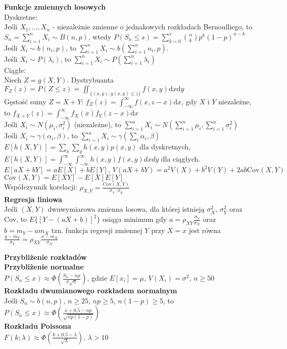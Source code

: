 \documentclass[10pt,landscape,a4paper,notitlepage]{article}
\begin{document}
\begin{multicols*}{4}
        \textbf{Funkcje zmiennych losowych}\\
        Dyskretne:\\
        Jeśli $X_1,\ldots,X_n$ - niezależnie zmienne o jednakowych rozkładach Bernoulliego, to $S_n=\sum_{i=1}^nX_i\sim B(n,p)$, wtedy $P(S_n\leq s)=\sum_{k=0}^s\binom{n}{k}p^k(1-p)^{n-k}$\\
        Jeśli $X_i\sim b(n_i,p)$, to $\sum_{i=1}^nX_i\sim b(\sum_{i=1}^nn_i,p)$.\\
        Jeśli $X_i\sim P(\lambda_i)$, to $\sum_{i=1}^nX_i\sim P(\sum_{i=1}^n\lambda_i)$\\
        Ciągłe:\\
        Niech $Z=g(X,Y)$. Dystrybuanta $F_Z(z)=P(Z\leq z)=\iint_{\{(x,y):g(x,y)\leq z\}}f(x,y)\mathrm{d}x\mathrm{d}y$\\
        Gęstość sumy $Z=X+Y:\,f_Z(z)=\int_{-\infty}^{\infty}f(x,z-x)\mathrm{d}x$, 
        gdy $X$ i $Y$ niezależne, to $f_{X+Y}(z)=\int_{-\infty}^{\infty}f_X(x)f_Y(z-x)\mathrm{d}x$\\
        Jeśli $X_i\sim N(\mu_i,\sigma_i^2)$ (niezależne), to $\sum_{i=1}^nX_i\sim N(\sum_{i=1}^{n}\mu_i,\sum_{i=1}^n\sigma_i^2)$\\
        Jeśli $X_i\sim \gamma(\alpha_i,\beta)$, to $\sum_{i=1}^nX_i\sim \gamma(\sum_i\alpha_i,\beta)$\\
        $E[h(X,Y)]=\sum_x\sum_yh(x,y)p(x,y)$ dla dyskretnych, $E[h(X,Y)]=\int_{-\infty}^{\infty}\int_{-\infty}^{\infty}h(x,y)f(x,y)dxdy$ dla ciągłych.\\
        $E[aX+bY]=aE[X]+bE[Y],\,V(aX+bY)=a^2V(X)+b^2V(Y)+2ab\mathrm{Cov}(X,Y)$\\
        $\mathrm{Cov}(X,Y)=E[XY]-E[X]E[Y]$\\
        Współczynnik korelacji: $\rho_{X,Y}=\frac{\mathrm{Cov}(X,Y)}{\sigma_x\cdot\sigma_y}$\\
        \textbf{Regresja liniowa}\\
        Jeśli $(X,Y)$ dwuwymiarowa zmienna losowa, dla której istnieją $\sigma_X^2,\,\sigma_Y^2$ oraz Cov, to $E\{[Y-(aX+b)]^2\}$ osiąga minimum gdy $a=\rho_{XY}\frac{\sigma_Y}{\sigma_X}$ oraz $b=m_Y-am_X$
        tzn. funkcja regresji zmiennej $Y$ przy $X=x$ jest równa $\frac{y-m_Y}{\sigma_Y}=\rho_{XY}\frac{x-m_X}{\sigma_X}$

        \noindent\textbf{\large Przybliżenie rozkładów}\\
        \textbf{Przybliżenie normalne}\\
        $P(S_n\leq x)\approx \Phi(\frac{S_n-n\mu}{\sigma\sqrt{n}})$, gdzie $E[x_i]=\mu,\,V(X_i)=\sigma^2,\,n\geq 50$\\
        \textbf{Rozkładu dwumianowego rozkładem normalnym}\\
        Jeśli $S_n\sim b(n,p),\,n\geq 25,\, np\geq 5,\, n(1-p)\geq 5$, to $P(S_n\leq x)\approx\Phi\left(\frac{x+0.5-np}{\sqrt{np(1-p)}}\right)$\\
        \textbf{Rozkładu Poissona}\\
        $F(k;\lambda)\approx \Phi\left(\frac{k+0.5-\lambda}{\sqrt{\lambda}}\right),\,\lambda>10$


\end{multicols*}
\end{document}
